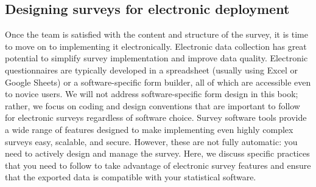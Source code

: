 \subsection{Designing surveys for electronic deployment}
Once the team is satisfied with the content and structure of the survey,
it is time to move on to implementing it electronically.
Electronic data collection has great potential
to simplify survey implementation and improve data quality.
Electronic questionnaires are typically developed
in a spreadsheet (usually using Excel or Google Sheets)
or a software-specific form builder,
all of which are accessible even to novice users.
We will not address software-specific form design in this book;
rather, we focus on coding and design conventions that are important to follow
for electronic surveys regardless of software choice.
Survey software tools provide a wide range of features
designed to make implementing even highly complex surveys
easy, scalable, and secure.
However, these are not fully automatic:
you need to actively design and manage the survey.
Here, we discuss specific practices that you need to follow
to take advantage of electronic survey features
and ensure that the exported data
is compatible with your statistical software.

